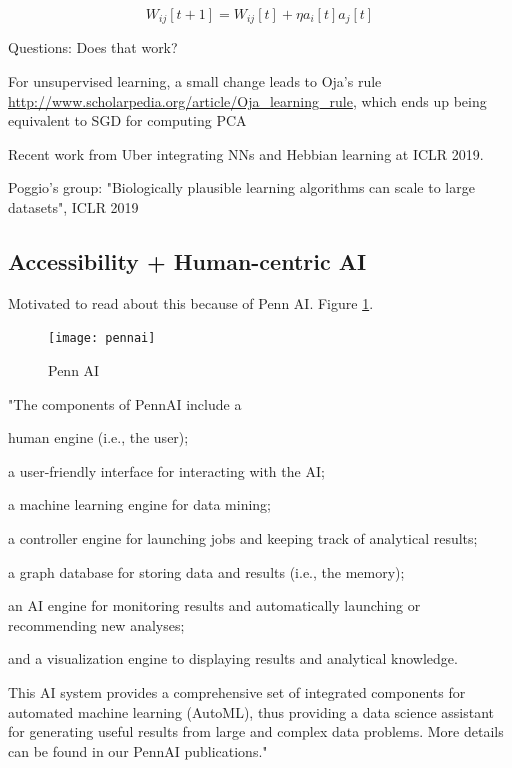 \documentclass[english]{article}
\begin{document}
$$W_{ij}[t+1]=W_{ij}[t]+\eta a_i[t]a_j[t]$$

\item Questions: Does that work?

\item For unsupervised learning, a small change leads to Oja's rule \url{http://www.scholarpedia.org/article/Oja_learning_rule}, which ends up being equivalent to SGD for computing PCA


\item Recent work from Uber integrating NNs and Hebbian learning at ICLR 2019. 

Poggio's group: "Biologically plausible learning algorithms can scale to large datasets", ICLR 2019

\eenum 


\subsection{Accessibility + Human-centric AI}


\benum 
\item Motivated to read about this because of Penn AI. Figure \ref{Penn AI}.

\begin{figure}[h!]
  \centering
  \texttt{[image: pennai]}
  \caption{Penn AI}
  \label{Penn AI}
\end{figure}


\item "The components of PennAI include a 

human engine (i.e., the user); 

a user-friendly interface for interacting with the AI; 

a machine learning engine for data mining; 

a controller engine for launching jobs and keeping track of analytical results; 

a graph database for storing data and results (i.e., the memory); 

an AI engine for monitoring results and automatically launching or recommending new analyses; 

and a visualization engine to displaying results and analytical knowledge. 

This AI system provides a comprehensive set of integrated components for automated machine learning (AutoML), thus providing a data science assistant for generating useful results from large and complex data problems. More details can be found in our PennAI publications."
\end{document}
